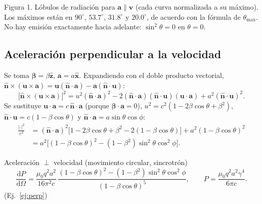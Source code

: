 \documentclass[11pt,a4paper]{article}
\newcommand{\nh}{\hat{\mathbf n}}
\newcommand{\bv}{\mathbf v}
\newcommand{\av}{\mathbf a}
\newcommand{\uv}{\mathbf u}
\newcommand{\dd}{\mathrm d}
\newcommand{\bbeta}{\bm\beta}
\theoremstyle{remark}
\begin{document}
\begin{center}

{\small Figura 1. Lóbulos de radiación para $\av\parallel\bv$ (cada curva normalizada a su máximo).
Los máximos están en $90^\circ$, $53.7^\circ$, $31.8^\circ$ y $20.0^\circ$, de acuerdo con la fórmula
de $\theta_{\max}$. No hay emisión exactamente hacia adelante: $\sin^2\theta=0$ en $\theta=0$.}
\end{center}

\subsection{Aceleración perpendicular a la velocidad}

Se toma $\bbeta=\beta\hat{\mathbf z}$, $\av=a\hat{\mathbf x}$. Expandiendo con el doble producto vectorial,
$\nh\times(\uv\times\av)=\uv(\nh\cdot\av)-\av(\nh\cdot\uv)$:
\[
|\nh\times(\uv\times\av)|^2=u^2(\nh\cdot\av)^2-2(\nh\cdot\av)(\nh\cdot\uv)(\uv\cdot\av)+a^2(\nh\cdot\uv)^2.
\]
Se sustituye $\uv\cdot\av=c\,\nh\cdot\av$ (porque $\bbeta\cdot\av=0$), $u^2=c^2(1-2\beta\cos\theta+\beta^2)$,
$\nh\cdot\uv=c(1-\beta\cos\theta)$ y $\nh\cdot\av=a\sin\theta\cos\phi$:
\begin{align*}
\frac{|\cdot|^2}{c^2}
&=(\nh\cdot\av)^2\Big[1-2\beta\cos\theta+\beta^2-2(1-\beta\cos\theta)\Big]+a^2(1-\beta\cos\theta)^2\\
&=a^2\Big[(1-\beta\cos\theta)^2-(1-\beta^2)\sin^2\theta\cos^2\phi\Big].
\end{align*}
\begin{resbox}{Aceleración $\perp$ velocidad (movimiento circular, sincrotrón)}
\begin{equation}
\frac{\dd P}{\dd\Omega}=\frac{\mu_0q^2a^2}{16\pi^2c}\,
\frac{(1-\beta\cos\theta)^2-(1-\beta^2)\sin^2\theta\cos^2\phi}{(1-\beta\cos\theta)^5},
\qquad P=\frac{\mu_0q^2a^2\gamma^4}{6\pi c}.
\label{eq:perp}
\end{equation}
(Ej.~\ref{ej:perp})
\end{resbox}
\end{document}
